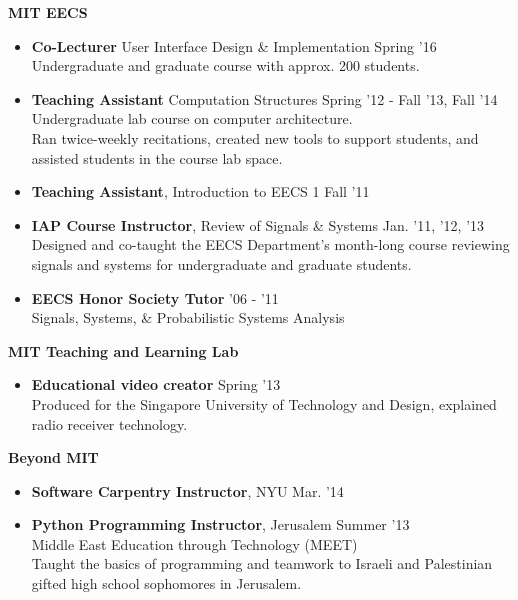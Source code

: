 \documentclass[margin]{res}
\begin{document}
\begin{resume}
{\bf MIT EECS}
\begin{itemize}[leftmargin=*] %
\item {\bf Co-Lecturer} User Interface Design \& Implementation  \hfill Spring '16 \\ Undergraduate and graduate course with approx. 200 students.  
\item {\bf Teaching Assistant} Computation Structures \hfill Spring '12 - Fall '13, Fall '14 \\Undergraduate lab course on computer architecture.  \\Ran twice-weekly recitations, created new tools to support students, and assisted students in the course lab space.  
\item {\bf Teaching Assistant}, Introduction to EECS 1 \hfill Fall '11 
\item {\bf IAP Course Instructor}, Review of Signals \& Systems \hfill Jan. '11, '12, '13 \\Designed and co-taught the EECS Department's month-long course reviewing signals and systems for undergraduate and graduate students.

\item {\bf EECS Honor Society Tutor} \hfill '06 - '11 \\Signals, Systems, \& Probabilistic Systems Analysis %
\end{itemize}

{\bf MIT Teaching and Learning Lab}

\begin{itemize}[leftmargin=*] %
\item {\bf Educational video creator} \hfill Spring '13 \\
Produced for the Singapore University of Technology and Design, explained radio receiver technology.
\end{itemize}


{\bf Beyond MIT}

\begin{itemize}[leftmargin=*] %
\item {\bf Software Carpentry Instructor}, NYU \hfill Mar. '14  
\item {\bf Python Programming Instructor}, Jerusalem \hfill Summer '13 \\Middle East Education through Technology (MEET) \\ Taught the basics of programming and teamwork to Israeli and Palestinian gifted high school sophomores in Jerusalem.


\end{itemize}
\end{resume}
\end{document}
